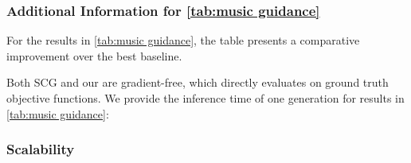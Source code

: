 \subsubsection{Additional Information for \cref{tab:music guidance}}
For the results in \cref{tab:music guidance}, the table presents a comparative improvement over the best baseline.


\begin{table}[H]
    \centering
    \caption{Improvement of \xcleansampling in music generation.}
\end{table}



Both SCG and our \xcleansampling are gradient-free, which directly evaluates on ground truth objective functions. We provide the inference time of one generation for results in \cref{tab:music guidance}:

\begin{table}[H]
    \centering
    \caption{Time(s) for SCG and \xcleansampling corresponding to results in \cref{tab:music guidance}.}
\end{table}



\subsubsection{Scalability}\label{app:scaling music sec}



